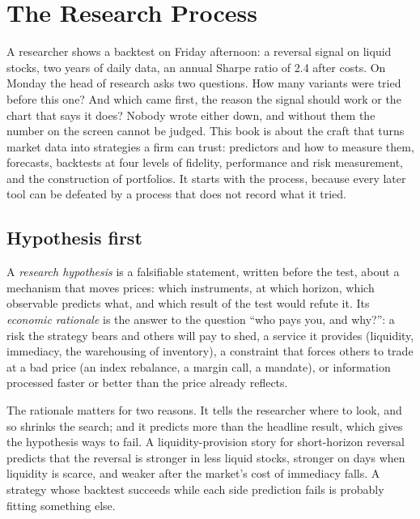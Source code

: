 \chapter{The Research Process}\label{ch:rs:the-research-process}

A researcher shows a backtest on Friday afternoon: a reversal signal on liquid stocks, two years of daily data, an annual
Sharpe ratio of 2.4 after costs. On Monday the head of research asks two questions. How many variants were tried before this
one? And which came first, the reason the signal should work or the chart that says it does? Nobody wrote either down, and
without them the number on the screen cannot be judged. This book is about the craft that turns market data into strategies a
firm can trust: predictors and how to measure them, forecasts, backtests at four levels of fidelity, performance and risk
measurement, and the construction of portfolios. It starts with the process, because every later tool can be defeated by a
process that does not record what it tried.

\section{Hypothesis first}

\begin{definition}\label{def:rs:the-research-process:hypothesis}
A \emph{research hypothesis} is a falsifiable statement, written before the test, about a
mechanism that moves prices: which instruments, at which horizon, which observable predicts what, and which result of the
test would refute it. Its \emph{economic rationale} is the answer to the question ``who pays you,
and why?'': a risk the strategy bears and others will pay to shed, a service it provides (liquidity, immediacy, the
warehousing of inventory), a constraint that forces others to trade at a bad price (an index rebalance, a margin call, a
mandate), or information processed faster or better than the price already reflects.
\end{definition}

The rationale matters for two reasons. It tells the researcher where to look, and so shrinks the search; and it predicts
more than the headline result, which gives the hypothesis ways to fail. A liquidity-provision story for short-horizon
reversal predicts that the reversal is stronger in less liquid stocks, stronger on days when liquidity is scarce, and
weaker after the market's cost of immediacy falls. A strategy whose backtest succeeds while each side prediction fails is
probably fitting something else.

